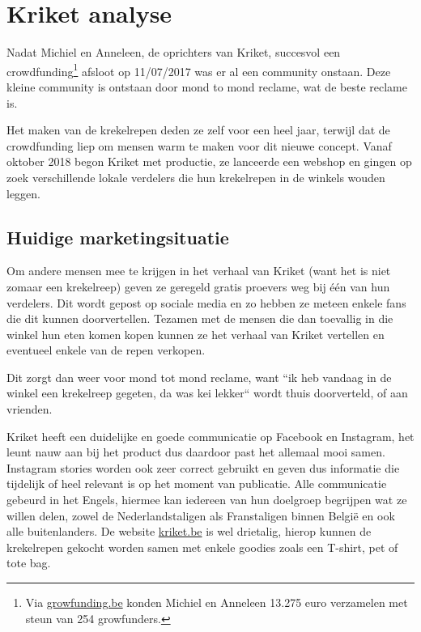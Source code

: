 
\chapter{Kriket analyse}
\label{ch:analyse}

Nadat Michiel en Anneleen, de oprichters van Kriket, succesvol een crowdfunding\footnote{Via \href{https://www.growfunding.be/nl/bxl/kriket}{growfunding.be} konden Michiel en Anneleen 13.275 euro verzamelen met steun van 254 growfunders.} afsloot op 11/07/2017 was er al een community onstaan. Deze kleine community is ontstaan door mond to mond reclame, wat de beste reclame is.

Het maken van de krekelrepen deden ze zelf voor een heel jaar, terwijl dat de crowdfunding liep om mensen warm te maken voor dit nieuwe concept. Vanaf oktober 2018 begon Kriket met productie, ze lanceerde een webshop en gingen op zoek verschillende lokale verdelers die hun krekelrepen in de winkels wouden leggen. 

\section{Huidige marketingsituatie}
\label{sec:huidige-marketingsituatie}
Om andere mensen mee te krijgen in het verhaal van Kriket (want het is niet zomaar een krekelreep) geven ze geregeld gratis proevers weg bij één van hun verdelers. Dit wordt gepost op sociale media en zo hebben ze meteen enkele fans die dit kunnen doorvertellen. Tezamen met de mensen die dan toevallig in die winkel hun eten komen kopen kunnen ze het verhaal van Kriket vertellen en eventueel enkele van de repen verkopen.

Dit zorgt dan weer voor mond tot mond reclame, want ``ik heb vandaag in de winkel een krekelreep gegeten, da was kei lekker`` wordt thuis doorverteld, of aan vrienden. 

Kriket heeft een duidelijke en goede communicatie op Facebook en Instagram, het leunt nauw aan bij het product dus daardoor past het allemaal mooi samen. Instagram stories worden ook zeer correct gebruikt en geven dus informatie die tijdelijk of heel relevant is op het moment van publicatie. Alle communicatie gebeurd in het Engels, hiermee kan iedereen van hun doelgroep begrijpen wat ze willen delen, zowel de Nederlandstaligen als Franstaligen binnen België en ook alle buitenlanders. De website \href{https://kriket.be}{kriket.be} is wel drietalig, hierop kunnen de krekelrepen gekocht worden samen met enkele goodies zoals een T-shirt, pet of tote bag. 

